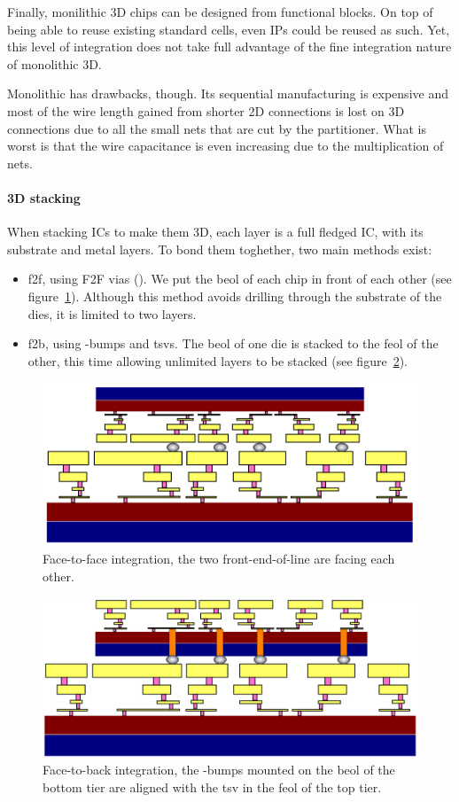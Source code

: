 \documentclass[11pt,a4paper]{report} %
\theoremstyle{customdef}
\begin{document}
Finally, monilithic 3D chips can be designed from functional blocks.
On top of being able to reuse existing standard cells, even IPs could be reused as such.
Yet, this level of integration does not take full advantage of the fine integration nature of monolithic 3D.

Monolithic has drawbacks, though.
Its sequential manufacturing is expensive and most of the wire length gained from shorter 2D connections is lost on 3D connections due to all the small nets that are cut by the partitioner.
What is worst is that the wire capacitance is even increasing due to the multiplication of nets.


\paragraph{3D stacking}
When stacking ICs to make them 3D, each layer is a full fledged IC, with its substrate and metal layers.
To bond them toghether, two main methods exist:
\begin{itemize}
	\item \gls{f2f}, using F2F vias (\citep{Peng2017}). We put the \gls{beol} of each chip in front of each other (see figure~\ref{fig:f2f}).
	Although this method avoids drilling through the substrate of the dies, it is limited to two layers.
	\item \gls{f2b}, using \textmu-bumps and \glspl{tsv}. The \gls{beol} of one die is stacked to the \gls{feol} of the other, this time allowing unlimited layers to be stacked (see figure~\ref{fig:f2b}).
\end{itemize}

\begin{figure}[!h]
\centering
\includegraphics[width=.6\textwidth]{img/f2f.png}
\caption{Face-to-face integration, the two front-end-of-line are facing each other.}
\label{fig:f2f}
\end{figure}

\begin{figure}[!h]
\centering
\includegraphics[width=.6\textwidth]{img/f2b.png}
\caption{Face-to-back integration, the \textmu-bumps mounted on the \gls{beol} of the bottom tier are aligned with the \gls{tsv} in the \gls{feol} of the top tier.}
\label{fig:f2b}
\end{figure}
\end{document}
